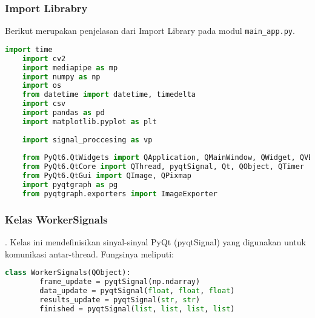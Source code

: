 \documentclass[11pt,a4paper]{article}
\begin{document}
\subsubsection{Import Librabry}
     Berikut merupakan penjelasan dari Import Library pada modul \texttt{main\_app.py}.
     \begin{lstlisting}[language=Python, caption=Import Library pada modul \texttt{main\_app.py},label={labelkode}]
    import time
    import cv2
    import mediapipe as mp
    import numpy as np
    import os
    from datetime import datetime, timedelta
    import csv
    import pandas as pd
    import matplotlib.pyplot as plt
    
    import signal_proccesing as vp
    
    from PyQt6.QtWidgets import QApplication, QMainWindow, QWidget, QVBoxLayout, QHBoxLayout, QLabel, QPushButton
    from PyQt6.QtCore import QThread, pyqtSignal, Qt, QObject, QTimer
    from PyQt6.QtGui import QImage, QPixmap
    import pyqtgraph as pg
    from pyqtgraph.exporters import ImageExporter
    \end{lstlisting}

\subsubsection{Kelas WorkerSignals}.
     Kelas ini mendefinisikan sinyal-sinyal PyQt (pyqtSignal) yang digunakan untuk komunikasi antar-thread. Fungsinya meliputi:
     \begin{lstlisting}[language=Python, caption=Kelas WorkerSignals,label={labelkode}]
    class WorkerSignals(QObject):
        frame_update = pyqtSignal(np.ndarray)
        data_update = pyqtSignal(float, float, float)
        results_update = pyqtSignal(str, str)
        finished = pyqtSignal(list, list, list, list)
    \end{lstlisting}
    
\end{document}
